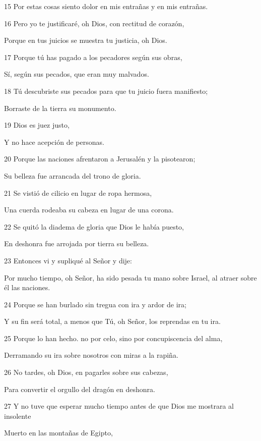 \par 15 Por estas cosas siento dolor en mis entrañas y en mis entrañas.
\par   
\par 16 Pero yo te justificaré, oh Dios, con rectitud de corazón,
\par     Porque en tus juicios se muestra tu justicia, oh Dios.
\par 17 Porque tú has pagado a los pecadores según sus obras,
\par     Sí, según sus pecados, que eran muy malvados.
\par 18 Tú descubriste sus pecados para que tu juicio fuera manifiesto;
\par     Borraste de la tierra su monumento.
\par 19 Dios es juez justo,
\par     Y no hace acepción de personas.
\par 20 Porque las naciones afrentaron a Jerusalén y la pisotearon;
\par     Su belleza fue arrancada del trono de gloria.
\par 21 Se vistió de cilicio en lugar de ropa hermosa,
\par     Una cuerda rodeaba su cabeza en lugar de una corona.
\par 22 Se quitó la diadema de gloria que Dios le había puesto,
\par     En deshonra fue arrojada por tierra su belleza.
\par 23 Entonces vi y supliqué al Señor y dije:
\par     Por mucho tiempo, oh Señor, ha sido pesada tu mano sobre Israel, al atraer sobre él las naciones.
\par 24 Porque se han burlado sin tregua con ira y ardor de ira;
\par     Y su fin será total, a menos que Tú, oh Señor, los reprendas en tu ira.
\par 25 Porque lo han hecho. no por celo, sino por concupiscencia del alma,
\par     Derramando su ira sobre nosotros con miras a la rapiña.
\par 26 No tardes, oh Dios, en pagarles sobre sus cabezas,
\par     Para convertir el orgullo del dragón en deshonra.
\par 27 Y no tuve que esperar mucho tiempo antes de que Dios me mostrara al insolente
\par     Muerto en las montañas de Egipto,
